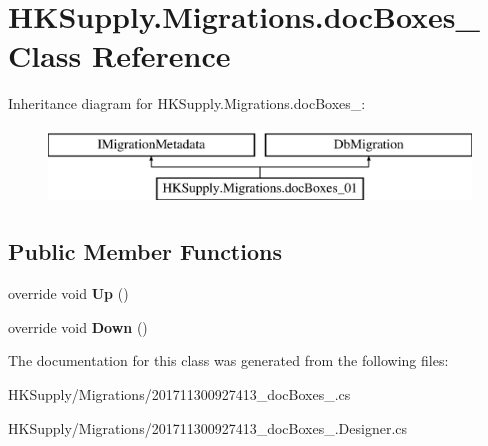 \hypertarget{class_h_k_supply_1_1_migrations_1_1doc_boxes__01}{}\section{H\+K\+Supply.\+Migrations.\+doc\+Boxes\+\_ Class Reference}
\label{class_h_k_supply_1_1_migrations_1_1doc_boxes__01}
Inheritance diagram for H\+K\+Supply.\+Migrations.\+doc\+Boxes\+\_\+:\begin{figure}[H]
\begin{center}
\leavevmode
\includegraphics[height=2.000000cm]{class_h_k_supply_1_1_migrations_1_1doc_boxes__01}
\end{center}
\end{figure}
\subsection*{Public Member Functions}
\begin{DoxyCompactItemize}
\item 
\mbox{\label{class_h_k_supply_1_1_migrations_1_1doc_boxes__01_ab48ebb73fee9cef9cdab16f75a206d73}} 
override void {\bfseries Up} ()
\item 
\mbox{\label{class_h_k_supply_1_1_migrations_1_1doc_boxes__01_a2c5d04dd010429cd83f4661a058681c9}} 
override void {\bfseries Down} ()
\end{DoxyCompactItemize}


The documentation for this class was generated from the following files\+:\begin{DoxyCompactItemize}
\item 
H\+K\+Supply/\+Migrations/201711300927413\+\_\+doc\+Boxes\+\_.\+cs\item 
H\+K\+Supply/\+Migrations/201711300927413\+\_\+doc\+Boxes\+\_.\+Designer.\+cs\end{DoxyCompactItemize}

